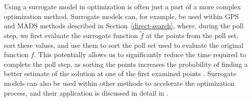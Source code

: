 Using a surrogate model in optimization is often just a part of a more complex optimization method. Surrogate models can, for example, be used within GPS and MADS methods described in Section~\ref{direct-search}, where, during the poll step, we first evaluate the surrogate function \( \tilde{f} \) at the points from the poll set, sort these values, and use them to sort the poll set used to evaluate the original function \( f \). This potentially allows us to significantly reduce the time required to complete the poll step, as sorting the points increases the probability of finding a better estimate of the solution at one of the first examined points \cite{BBO-textbook}. Surrogate models can also be used within other methods to accelerate the optimization process, and their application is discussed in detail in \cite{BBO-textbook, two-decades}.

